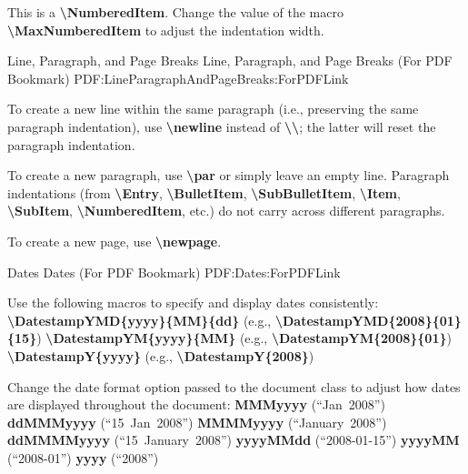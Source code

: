 \documentclass[letterpaper,MMMyyyy,nonstopmode]{simpleresumecv}
\newcommand{\CVNote}{CV compiled on {\today} with XeLaTeX for UTD}
\newcommand{\Code}[1]{\mbox{\textbf{#1}}}
\newcommand{\CodeCommand}[1]{\mbox{\textbf{\textbackslash{#1}}}}
\begin{document}
\begin{Body}
	\Gap
	\NumberedItem{[42]}
	This is a \CodeCommand{NumberedItem}.
	Change the value of the macro \CodeCommand{MaxNumberedItem} to adjust the indentation width.
	
	\BigGap
	\SubSection
	{Line, Paragraph, and Page Breaks}
	{Line, Paragraph, and Page Breaks (For PDF Bookmark)}
	{PDF:LineParagraphAndPageBreaks:ForPDFLink}
	
	\Gap
	\BulletItem
	To create a new line within the same paragraph (i.e., preserving the same paragraph indentation), use 		\CodeCommand{newline} instead of \CodeCommand{\textbackslash};
	the latter will reset the paragraph indentation.

	\Gap
	\BulletItem
	To create a new paragraph, use \CodeCommand{par} or simply leave an empty line.
	Paragraph indentations (from
	\CodeCommand{Entry},
	\CodeCommand{BulletItem},
	\CodeCommand{SubBulletItem},
	\CodeCommand{Item},
	\CodeCommand{SubItem},
	\CodeCommand{NumberedItem},
	etc.) do not carry across different paragraphs.
	
	\Gap
	\BulletItem
	To create a new page, use \CodeCommand{newpage}.
	
	\BigGap
	\SubSection
	{Dates}
	{Dates (For PDF Bookmark)}
	{PDF:Dates:ForPDFLink}
	
	\Gap
	\BulletItem
	Use the following macros to specify and display dates consistently:
	\SubBulletItem
	\CodeCommand{DatestampYMD\{yyyy\}\{MM\}\{dd\}}
	(e.g., \CodeCommand{DatestampYMD\{2008\}\{01\}\{15\}})
	\SubBulletItem
	\CodeCommand{DatestampYM\{yyyy\}\{MM\}}
	(e.g., \CodeCommand{DatestampYM\{2008\}\{01\}})
	\SubBulletItem
	\CodeCommand{DatestampY\{yyyy\}}
	(e.g., \CodeCommand{DatestampY\{2008\}})
	
	\Gap
	\BulletItem
	Change the date format option passed to the document class to adjust how dates are displayed throughout the document:
	\SubBulletItem
	\Code{MMMyyyy} (``Jan~2008'')
	\SubBulletItem
	\Code{ddMMMyyyy} (``15~Jan~2008'')
	\SubBulletItem
	\Code{MMMMyyyy} (``January~2008'')
	\SubBulletItem
	\Code{ddMMMMyyyy} (``15~January~2008'')
	\SubBulletItem
	\Code{yyyyMMdd} (``2008-01-15'')
	\SubBulletItem
	\Code{yyyyMM} (``2008-01'')
	\SubBulletItem
	\Code{yyyy} (``2008'')

	\endgroup
\fi
\end{Body}

\iffalse
    \UseNoteFont%
    \null\hfill%
    [\textit{\CVNote}]
\fi
\end{document}

